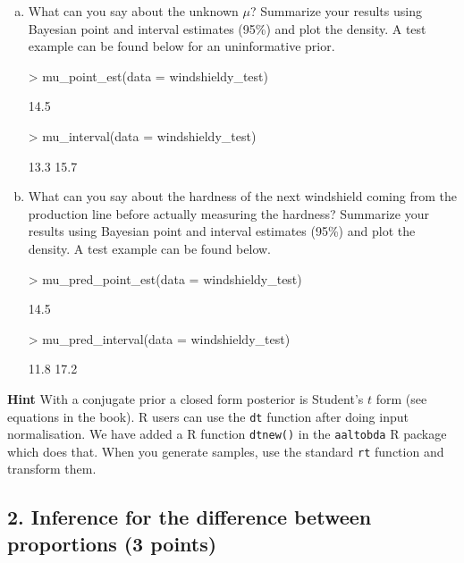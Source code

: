 \documentclass[a4paper,11pt]{article}
\begin{document}
\begin{enumerate}[a)]
\item What can you say about the unknown $\mu$? Summarize your results using Bayesian point and interval estimates (95\%) and plot the density. A test example can be found below for an uninformative prior. 
\begin{Schunk}
\begin{Sinput}
> mu_point_est(data = windshieldy_test)
\end{Sinput}
\begin{Soutput}
[1] 14.5
\end{Soutput}
\begin{Sinput}
> mu_interval(data = windshieldy_test)
\end{Sinput}
\begin{Soutput}
[1] 13.3 15.7
\end{Soutput}
\end{Schunk}
\item What can you say about the hardness of the next windshield
  coming from the production line before actually measuring the
  hardness? Summarize your results using Bayesian point and interval estimates (95\%) and plot the density. A test example can be found below.
\begin{Schunk}
\begin{Sinput}
> mu_pred_point_est(data = windshieldy_test)
\end{Sinput}
\begin{Soutput}
[1] 14.5
\end{Soutput}
\begin{Sinput}
> mu_pred_interval(data = windshieldy_test)
\end{Sinput}
\begin{Soutput}
[1] 11.8 17.2
\end{Soutput}
\end{Schunk}
\end{enumerate}
\textbf{Hint} With a conjugate prior a closed form posterior is Student's $t$ form (see equations in the book). 
R users can use the {\tt dt} function after doing input normalisation. We have added a R function {\tt dtnew()} in the {\tt aaltobda} R package which does that. When you generate samples, use the standard {\tt rt} function and transform them.


\subsection*{2. Inference for the difference between proportions (3 points)}
\end{document}
